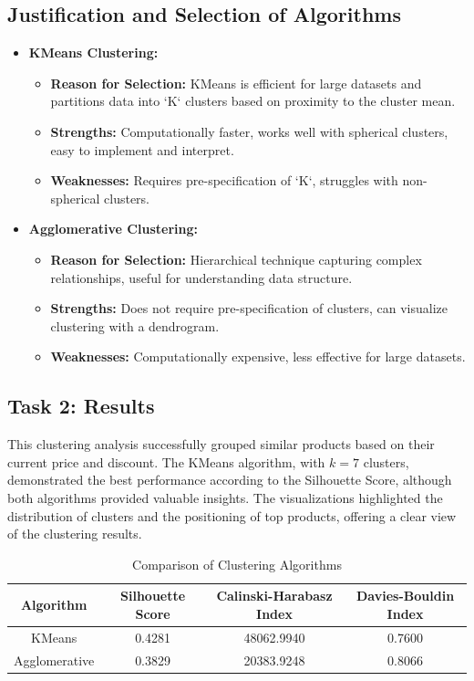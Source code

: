 \documentclass[a4paper,11pt]{article}
\begin{document}
\subsection{Justification and Selection of Algorithms}
\begin{itemize}
    \item \textbf{KMeans Clustering:} 
    \begin{itemize}
        \item \textbf{Reason for Selection:} KMeans is efficient for large datasets and partitions data into `K` clusters based on proximity to the cluster mean.
        \item \textbf{Strengths:} Computationally faster, works well with spherical clusters, easy to implement and interpret.
        \item \textbf{Weaknesses:} Requires pre-specification of `K`, struggles with non-spherical clusters.
    \end{itemize}
    \item \textbf{Agglomerative Clustering:}
    \begin{itemize}
        \item \textbf{Reason for Selection:} Hierarchical technique capturing complex relationships, useful for understanding data structure.
        \item \textbf{Strengths:} Does not require pre-specification of clusters, can visualize clustering with a dendrogram.
        \item \textbf{Weaknesses:} Computationally expensive, less effective for large datasets.
    \end{itemize}
\end{itemize}

\subsection{Task 2: Results}

This clustering analysis successfully grouped similar products based on their current price and discount. The KMeans algorithm, with $k=7$ clusters, demonstrated the best performance according to the Silhouette Score, although both algorithms provided valuable insights. The visualizations highlighted the distribution of clusters and the positioning of top products, offering a clear view of the clustering results.


\begin{table}[h!]
\centering
\begin{tabular}{|c|c|c|c|}
\hline
\textbf{Algorithm} & \textbf{Silhouette Score} & \textbf{Calinski-Harabasz Index} & \textbf{Davies-Bouldin Index} \\ \hline
KMeans             & 0.4281                    & 48062.9940                       & 0.7600                        \\ \hline
Agglomerative      & 0.3829                    & 20383.9248                       & 0.8066                        \\ \hline
\end{tabular}
\caption{Comparison of Clustering Algorithms}
\end{table}
\end{document}
